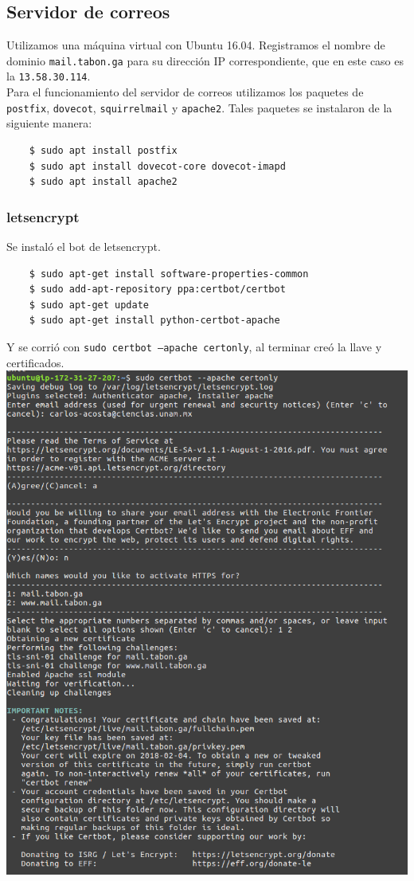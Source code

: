 \documentclass[9pt]{article}
\begin{document}
\subsection*{Servidor de correos}

Utilizamos una máquina virtual con Ubuntu 16.04. Registramos el nombre de dominio \texttt{mail.tabon.ga} para su dirección IP correspondiente, que en este caso es la \texttt{13.58.30.114}. \\
Para el funcionamiento del servidor de correos utilizamos los paquetes de \texttt{postfix}, \texttt{dovecot}, \texttt{squirrelmail} y \texttt{apache2}. Tales paquetes se instalaron de la siguiente manera: \\
\begin{verbatim}
    $ sudo apt install postfix
    $ sudo apt install dovecot-core dovecot-imapd
    $ sudo apt install apache2
\end{verbatim}

\subsubsection*{letsencrypt}

Se instaló el bot de \textsf{letsencrypt}.
\begin{verbatim}
    $ sudo apt-get install software-properties-common
    $ sudo add-apt-repository ppa:certbot/certbot
    $ sudo apt-get update
    $ sudo apt-get install python-certbot-apache 
\end{verbatim}
Y se corrió con \texttt{sudo certbot --apache certonly}, al terminar creó la llave y certificados. \\
\includegraphics[scale=0.3]{mail/2}
\end{document}

